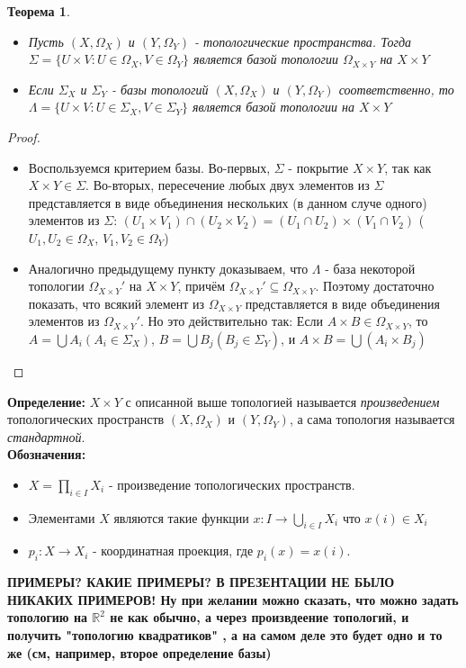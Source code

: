 \documentclass[a4paper,100pt]{article}
\theoremstyle{indented}
\newtheorem{theorem}{Теорема}
\begin{document}
\begin{theorem}
    ~
    \begin{itemize}
    \item Пусть $(X, \Omega_X)$ и $(Y, \Omega_Y)$ - топологические пространства. Тогда $\Sigma=\{U \times V : U \in \Omega_X, V \in \Omega_Y \}$ является базой топологии $\Omega_{X \times Y}$ на $X \times Y$
    \item Если $\Sigma_X$ и $\Sigma_Y$ - базы топологий $(X, \Omega_X)$ и $(Y, \Omega_Y)$ соответственно, то $\Lambda=\{U \times V : U \in \Sigma_X, V \in \Sigma_Y \}$ является базой топологии на $X \times Y$
    \end{itemize}
    \end{theorem}
    \begin{proof}
    ~
    \begin{itemize}
    \item Воспользуемся критерием базы. Во-первых, $\Sigma$ - покрытие $X \times Y$, так как $X \times Y \in \Sigma$. Во-вторых, пересечение любых двух элементов из $\Sigma$ представляется в виде объединения нескольких (в данном случе одного) элементов из $\Sigma$: $(U_1 \times V_1) \cap (U_2 \times V_2) = (U_1 \cap U_2) \times (V_1 \cap V_2)$ ($U_1, U_2 \in \Omega_X$, $V_1, V_2 \in \Omega_Y$)
    \item Аналогично предыдущему пункту доказываем, что $\Lambda$ - база некоторой топологии $\Omega_{X \times Y}'$ на $X \times Y$, причём $\Omega_{X \times Y} ' \subseteq \Omega_{X \times Y}$. Поэтому достаточно показать, что всякий элемент из $\Omega_{X \times Y}$ представляется в виде объединения элементов из $\Omega_{X \times Y}'$. Но это действительно так: Если $A \times B \in \Omega_{X \times Y}$, то $ A= \bigcup A_i (A_i \in \Sigma_X)$, $B= \bigcup B_j (B_j \in \Sigma_Y)$, и $A \times B = \bigcup (A_i \times B_j)$
    \end{itemize}
    \end{proof}
    \textbf{Определение:} $X \times Y$ с описанной выше топологией называется \textit{произведением} топологических пространств $(X, \Omega_X)$ и $(Y, \Omega_Y)$, а сама топология называется \textit{стандартной}.
    \\

    \textbf{Обозначения:} 
    \begin{itemize}
        \item $X=\prod_{i \in I} X_i $ - произведение топологических пространств.
        \item Элементами $X$ являются такие функции $x: I \rightarrow \bigcup_{i \in I} X_i$ что $x(i) \in X_i$
        \item $p_i:  X \rightarrow X_i$ - координатная проекция, где $p_i(x)=x(i)$.
    \end{itemize}
    \textbf{ПРИМЕРЫ? КАКИЕ ПРИМЕРЫ? В ПРЕЗЕНТАЦИИ НЕ БЫЛО НИКАКИХ ПРИМЕРОВ! Ну при желании можно сказать, что можно задать топологию на $\mathbb{R}^2$ не как обычно, а через произвдеение топологий, и получить "топологию квадратиков" , а на самом деле это будет одно и то же (см, например, второе определение базы)}
    \\
\end{document}
